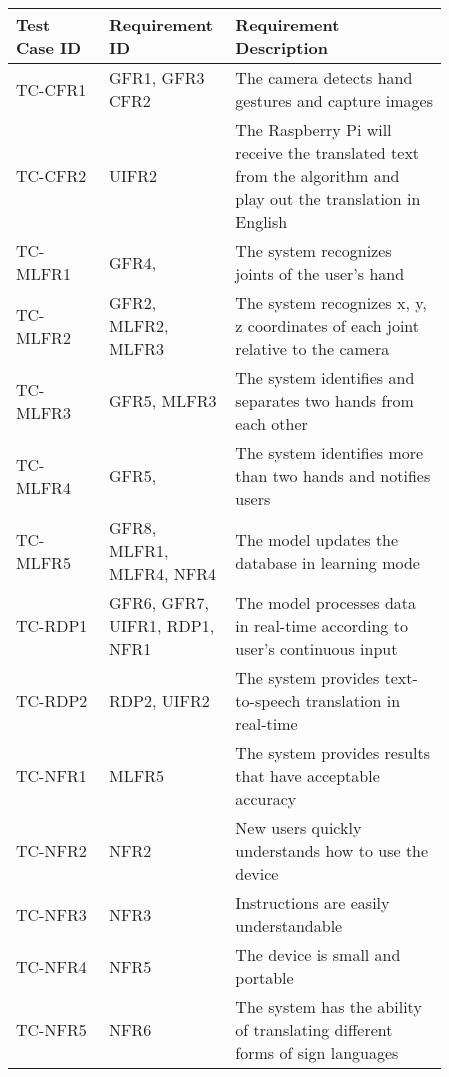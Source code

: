 \documentclass[12pt]{article}
\begin{document}
\renewcommand{\arraystretch}{1.2}
\noindent \begin{tabularx}{\textwidth}{p{0.2\linewidth}|p{0.2\linewidth}|p{0.46\linewidth}}
\toprule
\textbf{Test Case ID} & \textbf{Requirement ID} & \textbf{Requirement Description}\\
\midrule
TC-CFR1 & GFR1, GFR3 CFR2 & The camera detects hand gestures and capture images\\ \hline
TC-CFR2 & UIFR2 & The Raspberry Pi will receive the translated text from the algorithm and play out the translation in English\\ \hline
TC-MLFR1 & GFR4,  & The system recognizes joints of the user’s hand\\ \hline
TC-MLFR2 & GFR2, MLFR2, MLFR3 & The system recognizes x, y, z coordinates of each joint relative to the camera\\ \hline
TC-MLFR3 & GFR5, MLFR3 & The system identifies and separates two hands from each other\\ \hline
TC-MLFR4 & GFR5,  & The system identifies more than two hands and notifies users\\ \hline
TC-MLFR5 & GFR8, MLFR1, MLFR4, NFR4 & The model updates the database in learning mode\\ \hline
TC-RDP1 & GFR6, GFR7, UIFR1, RDP1, NFR1 & The model processes data in real-time according to user’s continuous input\\ \hline
TC-RDP2 & RDP2, UIFR2 & The system provides text-to-speech translation in real-time\\ \hline
TC-NFR1 & MLFR5 & The system provides results that have acceptable accuracy\\ \hline
TC-NFR2 & NFR2 & New users quickly understands how to use the device\\ \hline
TC-NFR3 & NFR3 & Instructions are easily understandable\\ \hline
TC-NFR4 & NFR5 & The device is small and portable\\ \hline
TC-NFR5 & NFR6 & The system has the ability of translating different forms of sign languages\\
\bottomrule
\end{tabularx}

\newpage

\end{document}
